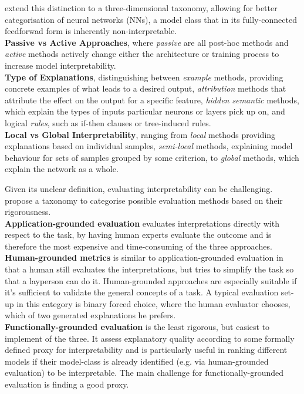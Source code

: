 \documentclass[twoside,11pt]{article}
\begin{document}
\citet[chap. 2]{survey_NN_interpretability} extend this distinction to a three-dimensional taxonomy, allowing for better categorisation of neural networks (NNs),
a model class that in its fully-connected feedforwad form is inherently non-interpretable. %
\\
\textbf{Passive vs Active Approaches}, where \textit{passive} are all post-hoc methods and \textit{active} methods actively change either the architecture or
training process to increase model interpretability.
\\
\textbf{Type of Explanations}, distinguishing between \textit{example} methods, providing concrete examples of what leads to a desired output, \textit{attribution}
methods that attribute the effect on the output for a specific feature, \textit{hidden semantic} methods, which explain the types of inputs particular neurons or layers
pick up on, and logical \textit{rules}, such as if-then clauses or tree-induced rules.
\\
\textbf{Local vs Global Interpretability}, ranging from \textit{local} methods providing explanations based on individual samples, \textit{semi-local} methods,
explaining model behaviour for sets of samples grouped by some criterion, to \textit{global} methods, which explain the network as a whole.

Given its unclear definition, evaluating interpretability can be challenging. \citet[3]{DoshiVelez2017TowardsAR} propose a taxonomy to categorise
possible evaluation methods based on their rigorousness.
\\
\textbf{Application-grounded evaluation} evaluates interpretations directly with respect to the task, by having human experts evaluate the outcome and
is therefore the most expensive and time-consuming of the three approaches.
\\
\textbf{Human-grounded metrics} is similar to application-grounded evaluation in that a human still evaluates the interpretations, but tries to simplify the task
so that a layperson can do it. Human-grounded approaches are especially suitable if it's sufficient to validate the general concepts of a task. A typical evaluation
set-up in this category is binary forced choice, where the human evaluator chooses, which of two generated explanations he prefers.
\\
\textbf{Functionally-grounded evaluation} is the least rigorous, but easiest to implement of the three. It assess explanatory quality according to some
formally defined proxy for interpretability and is particularly useful in ranking different models if their model-class is already identified
(e.g. via human-grounded evaluation) to be interpretable. The main challenge for functionally-grounded evaluation is finding a good proxy.
\end{document}
